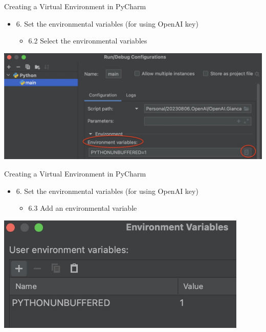 \documentclass{beamer}
\begin{document}
\begin{frame}
{\centerline{Creating a Virtual Environment in PyCharm}}
\begin{itemize}
    \item 6. Set the environmental variables (for using OpenAI key) 
    \begin{itemize}
    \item 6.2 Select the environmental variables
    \end{itemize} 
\end{itemize} 
\begin{center}
    \includegraphics[width=1\textwidth]{Coding/PyCharm.EnvironmentalVariables.jpg}
\end{center}
\end{frame}

\begin{frame}
{\centerline{Creating a Virtual Environment in PyCharm}}
\begin{itemize}
    \item 6. Set the environmental variables (for using OpenAI key) 
    \begin{itemize}
    \item 6.3 Add an environmental variable
    \end{itemize} 
\end{itemize} 
\begin{center}
    \includegraphics[width=0.9\textwidth]{Coding/PyCharm.AddEnvironmentalVariable.jpg}
\end{center}

\end{frame}
\end{document}
